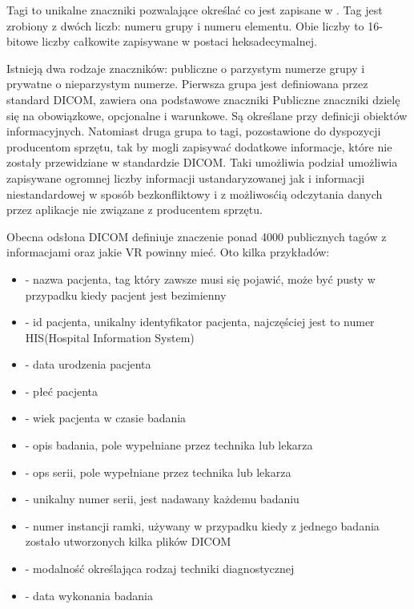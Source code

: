 Tagi to unikalne znaczniki pozwalające określać co jest zapisane w .
Tag jest zrobiony z dwóch liczb: numeru grupy i numeru elementu.
Obie liczby to 16-bitowe liczby całkowite zapisywane w postaci  heksadecymalnej.

Istnieją dwa rodzaje znaczników: publiczne o parzystym numerze grupy i prywatne o nieparzystym numerze.
Pierwsza grupa jest definiowana przez standard DICOM, zawiera ona podstawowe znaczniki
Publiczne znaczniki dzielę się na obowiązkowe, opcjonalne i warunkowe.
Są określane przy definicji obiektów informacyjnych.
Natomiast druga grupa to tagi, pozostawione do dyspozycji producentom sprzętu, tak by mogli zapisywać dodatkowe informacje, które nie zostały przewidziane w standardzie DICOM.
Taki umożliwia podział umożliwia zapisywane ogromnej liczby informacji ustandaryzowanej jak i informacji niestandardowej w sposób bezkonfliktowy i z możliwosćią odczytania danych przez aplikacje nie związane z producentem sprzętu.

Obecna odsłona DICOM definiuje znaczenie ponad 4000 publicznych tagów z informacjami oraz jakie VR powinny mieć.
Oto kilka przykładów:
\begin{itemize}
    \item {} - nazwa pacjenta, tag który zawsze musi się pojawić, może być pusty w przypadku kiedy pacjent jest bezimienny

    \item {} - id pacjenta, unikalny identyfikator pacjenta, najczęściej jest to numer HIS(Hospital Information System)

    \item {} - data urodzenia pacjenta

    \item {} - płeć pacjenta

    \item {} - wiek pacjenta w czasie badania

    \item {} - opis badania, pole wypełniane przez technika lub lekarza

    \item {} - ops serii, pole wypełniane przez technika lub lekarza

    \item {} - unikalny numer serii, jest nadawany każdemu badaniu

    \item {} - numer instancji ramki, używany w przypadku kiedy z jednego badania zostało utworzonych kilka plików DICOM

    \item {} - modalność określająca rodzaj techniki diagnostycznej

    \item {} - data wykonania badania
\end{itemize}



